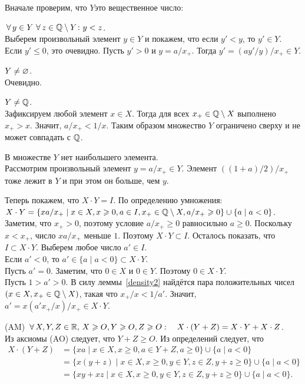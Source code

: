 \documentclass[a4paper,12pt]{article}
\begin{document}
\begin{items}{-3}
Вначале проверим, что $Y$\т это вещественное число:
\begin{nums}{-3}
\item
$\,\forall\, y\in Y \, \,\forall\, z \in \mathbb{Q}\setminus Y \colon y < z$.\\
Выберем произвольный элемент $y \in Y$ и покажем, что если $y' < y$, то $y' \in Y$. Если $y' \le 0$, это очевидно. Пусть $y' > 0$ и $y = a/x_+$. Тогда $y' = (ay'/y)/x_+ \in Y$.
\item
$Y \ne \varnothing$.\\
Очевидно.
\item
$Y \ne \mathbb{Q}$.\\
Зафиксируем любой элемент $x\in X$. Тогда для всех $x_+ \in \mathbb{Q}\setminus X$ выполнено $x_+ > x$. Значит, $a/x_+ < 1/x$. Таким образом множество $Y$ ограничено сверху и не может совпадать с $\mathbb{Q}$.
\item
В множестве $Y$ нет наибольшего элемента.\\
Рассмотрим произвольный элемент $y = a/x_+ \in Y$. Элемент $((1+a)/2)/x_+$ тоже лежит в $Y$ и при этом он больше, чем $y$.
\end{nums}
Теперь покажем, что $X \cdot Y = I$. По определению умножения:\\
$X \cdot Y = \{xa/x_+ \mid x\in X, x \geqslant 0, a\in I, x_+\in\mathbb{Q}\setminus X, a/x_+\geqslant 0\} \cup \{a \mid a<0\}$.\\
Заметим, что $x_+ > 0$, поэтому условие $a/x_+\ge 0$ равносильно $a \ge 0$.
Поскольку $x < x_+$, число $xa/x_+$ меньше $1$. Поэтому $X\cdot Y \subset I$. Осталось показать, что $I \subset X\cdot Y$. Выберем любое число $a' \in I$.\\
Если $a' < 0$, то $a' \in \{a \mid a<0\} \subset X\cdot Y$.\\
Пусть $a' = 0$. Заметим, что $0 \in X$ и $0 \in Y$. Поэтому $0 \in X\cdot Y$.\\
Пусть $1 > a' > 0$.
В силу леммы~\ref{density2} найдётся пара положительных чисел $(x \in X, x_+ \in \mathbb{Q}\setminus X)$, такая что $x_+/x < 1/a'$.
Значит, $a' = x(a'x_+/x)/x_+ \in X\cdot Y$.
\item[(AM)]
$\,\forall\, X,Y,Z\in \mathbb{R},\,X\geqslant O, Y\geqslant O,Z\geqslant O:\quad X\cdot(Y+Z)=X\cdot Y + X\cdot Z$.\\
Из аксиомы (AO) следует, что $Y+Z \ge O$. Из определений следует, что\\
$
\begin{aligned}
X\cdot (Y + Z) &= \{x a \mid x\in X, x \ge 0, a \in Y+Z, a\ge 0\} \cup \{a \mid a<0\}\\
&= \{x(y+z) \mid x\in X, x \ge 0, y\in Y, z\in Z, y+z\ge 0\} \cup \{a \mid a<0\}\\
&= \{xy+xz \mid x\in X, x \ge 0, y\in Y, z\in Z, y+z\ge 0\} \cup \{a \mid a<0\}.\\
\end{aligned}
$


\end{items}
\end{document}
